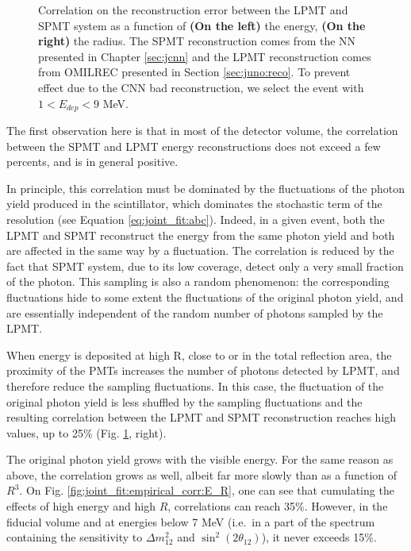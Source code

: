 \documentclass[../main.tex]{subfiles}
\begin{document}
\begin{figure}[ht]
\begin{subfigure}[t]{0.48\linewidth}
  \end{subfigure}
  \caption{Correlation on the reconstruction error between the LPMT and SPMT system as a function of \textbf{(On the left)} the energy, \textbf{(On the right)} the radius. The SPMT reconstruction comes from the NN presented in Chapter \ref{sec:jcnn} and the LPMT reconstruction comes from OMILREC presented in Section \ref{sec:juno:reco}. To prevent effect due to the CNN bad reconstruction, we select the event with $1 < E_{dep} < 9$ MeV.}
  \label{fig:joint_fit:empirical_corr:E_a_R}
\end{figure}

The first observation here is that in most of the detector volume, the correlation between the SPMT and LPMT energy reconstructions does not exceed a few percents, and is in general positive.

In principle, this correlation must be dominated by the fluctuations of the photon yield produced in the scintillator, which dominates the stochastic term of the resolution (see Equation \ref{eq:joint_fit:abc}). Indeed, in a given event, both the LPMT and SPMT reconstruct the energy from the same photon yield and both are affected in the same way by a fluctuation. The correlation is reduced by the fact that SPMT system, due to its low coverage, detect only a very small fraction of the photon. This sampling is also a random phenomenon: the corresponding fluctuations hide to some extent the fluctuations of the original photon yield, and are essentially independent of the random number of photons sampled by the LPMT.

When energy is deposited at high R, close to or in the total reflection area, the proximity of the PMTs increases the number of photons detected by LPMT, and therefore reduce the sampling fluctuations. In this case, the fluctuation of the original photon yield is less shuffled by the sampling fluctuations and the resulting correlation between the LPMT and SPMT reconstruction reaches high values, up to 25\% (Fig. \ref{fig:joint_fit:empirical_corr:E_a_R}, right).

The original photon yield grows with the visible energy. For the same reason as above, the correlation grows as well, albeit far more slowly than as a function of $R^3$. On Fig. \ref{fig:joint_fit:empirical_corr:E_R}, one can see that cumulating the effects of high energy and high $R$, correlations can reach 35\%. However, in the fiducial volume and at energies below 7 MeV (i.e.\ in a part of the spectrum containing the sensitivity to $\Delta m^2_{12}$ and $\sin^2(2 \theta_{12})$), it never exceeds 15\%.
\end{document}
